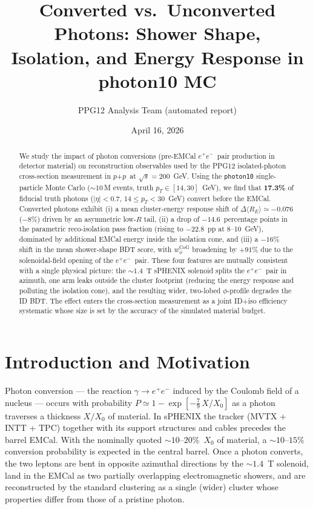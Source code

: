 \documentclass[11pt,a4paper]{article}
\title{Converted vs.\ Unconverted Photons: Shower Shape,\\
Isolation, and Energy Response in photon10 MC}
\author{PPG12 Analysis Team (automated report)}
\date{April 16, 2026}
\newcommand{\pp}{$p$+$p$}
\newcommand{\epem}{\ensuremath{e^{+}e^{-}}}
\begin{document}
\maketitle

\begin{abstract}
We study the impact of photon conversions (pre-EMCal \epem\ pair production in
detector material) on reconstruction observables used by the PPG12 isolated-photon
cross-section measurement in \pp\ at $\sqrt{s}=200$~GeV.  Using the
\texttt{photon10} single-particle Monte Carlo ($\sim 10$\,M events, truth
\(p_T \in [14,30]\)~GeV), we find that \textbf{17.3\%} of fiducial truth
photons ($|\eta|<0.7$, \(14 \le p_T < 30\)~GeV) convert before the EMCal.
Converted photons exhibit (i) a mean cluster-energy response shift of
\(\Delta\langle R_E \rangle \simeq -0.076\) (\(-8\%\)) driven by an asymmetric
low-$R$ tail,
(ii) a drop of $-14.6$~percentage points in the parametric reco-isolation pass
fraction (rising to $-22.8$~pp at 8--10~GeV), dominated by additional EMCal
energy inside the isolation cone,
and (iii) a $-16\%$ shift in the mean shower-shape BDT score, with
$w_{\phi}^{\mathrm{CoG}}$ broadening by $+91\%$ due to the solenoidal-field
opening of the \epem\ pair.
These four features are mutually consistent with a single physical picture:
the $\sim 1.4$~T sPHENIX solenoid splits the \epem\ pair in azimuth, one arm
leaks outside the cluster footprint (reducing the energy response and
polluting the isolation cone), and the resulting wider, two-lobed
$\phi$-profile degrades the ID BDT. The effect enters the cross-section
measurement as a joint ID$+$iso efficiency systematic whose size is set by
the accuracy of the simulated material budget.
\end{abstract}


\section{Introduction and Motivation}
\label{sec:intro}

Photon conversion --- the reaction \(\gamma \to \epem\) induced by the Coulomb
field of a nucleus --- occurs with probability \(P \simeq 1 - \exp\left[-\tfrac{7}{9}\,X/X_0\right]\)
as a photon traverses a thickness \(X/X_0\) of material. In sPHENIX the tracker
(MVTX + INTT + TPC) together with its support structures and cables precedes the
barrel EMCal. With the nominally quoted $\sim 10$--$20$\%~$X_0$ of material, a
\(\sim 10\)--$15\%$ conversion probability is expected in the central barrel.
Once a photon converts, the two leptons are bent in opposite azimuthal
directions by the $\sim 1.4$~T solenoid, land in the EMCal as two partially
overlapping electromagnetic showers, and are reconstructed by the standard
clustering as a single (wider) cluster whose properties differ from those of
a pristine photon.
\end{document}
